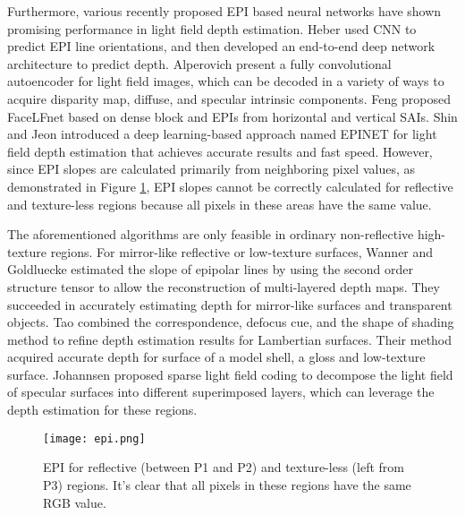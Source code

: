 \documentclass[10pt,twocolumn,letterpaper]{article}
\begin{document}
Furthermore, various recently proposed EPI based neural networks\cite{shin2018epinet, heber2016convolutional,heber2017neural,feng20173d, alperovich2018light} have shown promising performance in light field depth estimation. Heber \etal\cite{heber2016convolutional} used CNN to predict EPI line orientations, and then developed an end-to-end deep network architecture to predict depth\cite{heber2017neural}. Alperovich \etal\cite{alperovich2018light} present a fully convolutional autoencoder for light field images, which can be decoded in a variety of ways to acquire disparity map, diffuse, and specular intrinsic components. Feng \etal\cite{feng20173d} proposed FaceLFnet based on dense block and EPIs from horizontal and vertical SAIs. Shin and Jeon\cite{shin2018epinet} introduced a deep learning-based approach named EPINET for light field depth estimation that achieves accurate results and fast speed.  However, since EPI slopes are calculated primarily from neighboring pixel values, as demonstrated in Figure \ref{fig:epi}, EPI slopes cannot be correctly calculated for reflective and texture-less regions because all pixels in these areas have the same value.

The aforementioned algorithms are only feasible in ordinary non-reflective high-texture regions. For mirror-like reflective or low-texture surfaces, Wanner and Goldluecke\cite{wanner2014variational, wanner2013reconstructing} estimated the slope of epipolar lines by using the second order structure tensor to allow the reconstruction of multi-layered depth maps. They succeeded in accurately estimating depth for mirror-like surfaces and transparent objects. Tao \etal\cite{tao2017shape} combined the correspondence, defocus cue, and the shape of shading method to refine depth estimation results for Lambertian surfaces. Their method acquired accurate depth for surface of a model shell, a gloss and low-texture surface. Johannsen \etal\cite{johannsen2016sparse} proposed sparse light field coding to decompose the light field of specular surfaces into different superimposed layers, which can leverage the depth estimation for these regions.

\begin{figure}
	\begin{center}
		\texttt{[image: epi.png]}
	\end{center}
	\caption{EPI for reflective (between P1 and P2) and texture-less (left from P3) regions. It's clear that all pixels in these regions have the same RGB value.}
	\label{fig:epi}
\end{figure}
\end{document}
